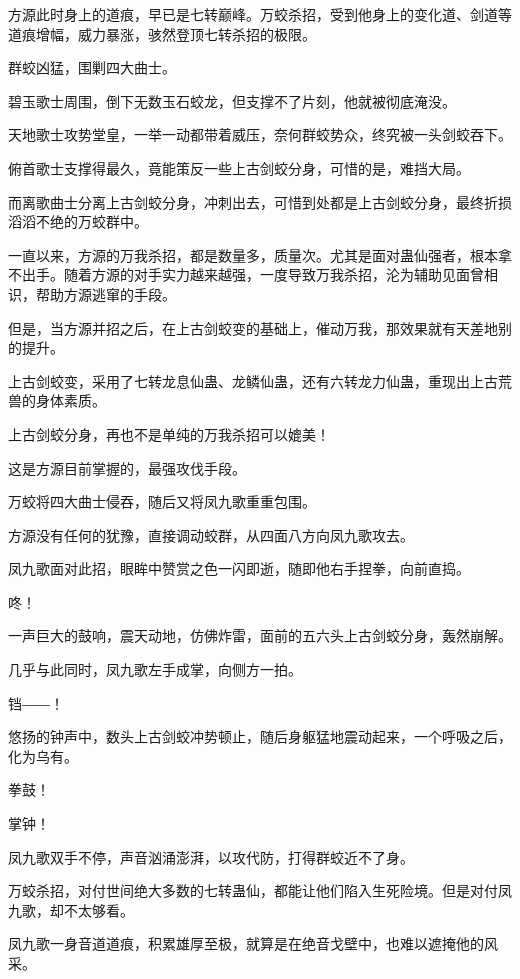 
\begin{this_body}

方源此时身上的道痕，早已是七转巅峰。万蛟杀招，受到他身上的变化道、剑道等道痕增幅，威力暴涨，骇然登顶七转杀招的极限。

群蛟凶猛，围剿四大曲士。

碧玉歌士周围，倒下无数玉石蛟龙，但支撑不了片刻，他就被彻底淹没。

天地歌士攻势堂皇，一举一动都带着威压，奈何群蛟势众，终究被一头剑蛟吞下。

俯首歌士支撑得最久，竟能策反一些上古剑蛟分身，可惜的是，难挡大局。

而离歌曲士分离上古剑蛟分身，冲刺出去，可惜到处都是上古剑蛟分身，最终折损滔滔不绝的万蛟群中。

一直以来，方源的万我杀招，都是数量多，质量次。尤其是面对蛊仙强者，根本拿不出手。随着方源的对手实力越来越强，一度导致万我杀招，沦为辅助见面曾相识，帮助方源逃窜的手段。

但是，当方源并招之后，在上古剑蛟变的基础上，催动万我，那效果就有天差地别的提升。

上古剑蛟变，采用了七转龙息仙蛊、龙鳞仙蛊，还有六转龙力仙蛊，重现出上古荒兽的身体素质。

上古剑蛟分身，再也不是单纯的万我杀招可以媲美！

这是方源目前掌握的，最强攻伐手段。

万蛟将四大曲士侵吞，随后又将凤九歌重重包围。

方源没有任何的犹豫，直接调动蛟群，从四面八方向凤九歌攻去。

凤九歌面对此招，眼眸中赞赏之色一闪即逝，随即他右手捏拳，向前直捣。

咚！

一声巨大的鼓响，震天动地，仿佛炸雷，面前的五六头上古剑蛟分身，轰然崩解。

几乎与此同时，凤九歌左手成掌，向侧方一拍。

铛――！

悠扬的钟声中，数头上古剑蛟冲势顿止，随后身躯猛地震动起来，一个呼吸之后，化为乌有。

拳鼓！

掌钟！

凤九歌双手不停，声音汹涌澎湃，以攻代防，打得群蛟近不了身。

万蛟杀招，对付世间绝大多数的七转蛊仙，都能让他们陷入生死险境。但是对付凤九歌，却不太够看。

凤九歌一身音道道痕，积累雄厚至极，就算是在绝音戈壁中，也难以遮掩他的风采。


\end{this_body}
